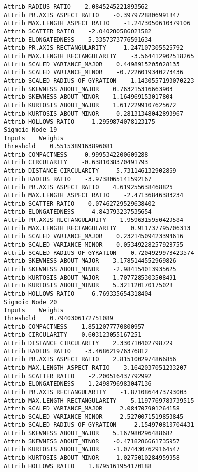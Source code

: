 \documentclass[
	article,			%
	11pt,				%
	oneside,			%
	a4paper,			%
	english,			%
	brazil,				%
	sumario=tradicional
	]{abntex2}
\begin{document}
\begin{lstlisting}
Attrib RADIUS RATIO    2.0845245221893562
Attrib PR.AXIS ASPECT RATIO    -0.3979728806991847
Attrib MAX.LENGTH ASPECT RATIO    -1.2473050610379106
Attrib SCATTER RATIO    -2.040280586021582
Attrib ELONGATEDNESS    5.3357373776591634
Attrib PR.AXIS RECTANGULARITY    -1.247107305526792
Attrib MAX.LENGTH RECTANGULARITY    -3.564412902518265
Attrib SCALED VARIANCE_MAJOR    0.4498915205028135
Attrib SCALED VARIANCE_MINOR    -0.7226019340273436
Attrib SCALED RADIUS OF GYRATION    1.1430557193070223
Attrib SKEWNESS ABOUT_MAJOR    0.763215316663903
Attrib SKEWNESS ABOUT_MINOR    1.164969153017804
Attrib KURTOSIS ABOUT_MAJOR    1.6172299107625672
Attrib KURTOSIS ABOUT_MINOR    -0.28131348042893967
Attrib HOLLOWS RATIO    -1.2959874078123175
Sigmoid Node 19
Inputs    Weights
Threshold    0.5515389163896081
Attrib COMPACTNESS    -0.9995342200609288
Attrib CIRCULARITY    -0.6381038370491793
Attrib DISTANCE CIRCULARITY    -5.731146132902869
Attrib RADIUS RATIO    -3.9738065141592167
Attrib PR.AXIS ASPECT RATIO    4.619255638468826
Attrib MAX.LENGTH ASPECT RATIO    -2.47136846383234
Attrib SCATTER RATIO    0.07462729529638402
Attrib ELONGATEDNESS    -4.843793237535654
Attrib PR.AXIS RECTANGULARITY    1.9596315950429584
Attrib MAX.LENGTH RECTANGULARITY    0.911737795706313
Attrib SCALED VARIANCE_MAJOR    0.23214509423394616
Attrib SCALED VARIANCE_MINOR    0.05349228257928755
Attrib SCALED RADIUS OF GYRATION    0.7204929978423574
Attrib SKEWNESS ABOUT_MAJOR    3.1785144552969826
Attrib SKEWNESS ABOUT_MINOR    -2.984154013935625
Attrib KURTOSIS ABOUT_MAJOR    1.7077285303508491
Attrib KURTOSIS ABOUT_MINOR    5.321120170175028
Attrib HOLLOWS RATIO    -6.769335654318404
Sigmoid Node 20
Inputs    Weights
Threshold    0.7940306172751089
Attrib COMPACTNESS    1.8512077770800957
Attrib CIRCULARITY    0.603123055167251
Attrib DISTANCE CIRCULARITY    2.330710402798729
Attrib RADIUS RATIO    -3.468621976376812
Attrib PR.AXIS ASPECT RATIO    2.8151002974866866
Attrib MAX.LENGTH ASPECT RATIO    3.1642037051233207
Attrib SCATTER RATIO    -2.200516437792992
Attrib ELONGATEDNESS    1.2498796983047136
Attrib PR.AXIS RECTANGULARITY    -1.8710864473793003
Attrib MAX.LENGTH RECTANGULARITY    5.1197769783739515
Attrib SCALED VARIANCE_MAJOR    -2.084707901264158
Attrib SCALED VARIANCE_MINOR    -2.5270071519853845
Attrib SCALED RADIUS OF GYRATION    -2.154970810704431
Attrib SKEWNESS ABOUT_MAJOR    5.167980296488682
Attrib SKEWNESS ABOUT_MINOR    -0.4718286661735957
Attrib KURTOSIS ABOUT_MAJOR    -1.0744307629164547
Attrib KURTOSIS ABOUT_MINOR    -1.0275010284959958
Attrib HOLLOWS RATIO    1.8795161954170188

\end{lstlisting}
\end{document}
